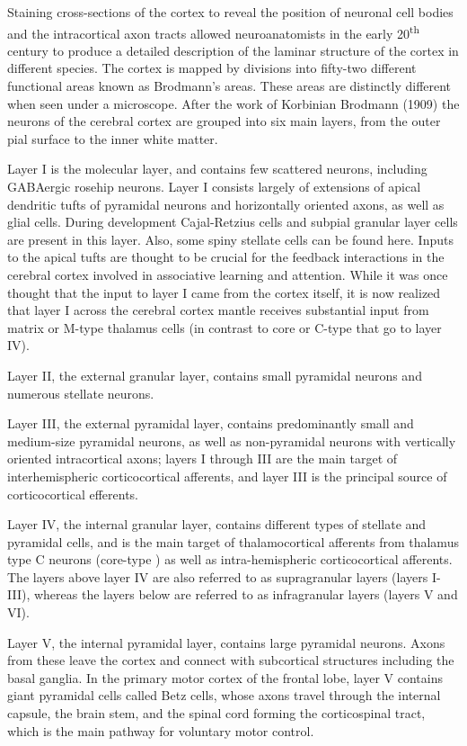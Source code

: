 Staining cross-sections of the cortex to reveal the position of neuronal cell bodies and the intracortical axon tracts allowed neuroanatomists in the early 20\textsuperscript{th} century to produce a detailed description of the laminar structure of the cortex in different species. The cortex is mapped by divisions into fifty-two different functional areas known as Brodmann's areas. These areas are distinctly different when seen under a microscope. After the work of Korbinian Brodmann (1909) the neurons of the cerebral cortex are grouped into six main layers, from the outer pial surface to the inner white matter.

Layer I is the molecular layer, and contains few scattered neurons, including GABAergic rosehip neurons. Layer I consists largely of extensions of apical dendritic tufts of pyramidal neurons and horizontally oriented axons, as well as glial cells. During development Cajal-Retzius cells and subpial granular layer cells are present in this layer. Also, some spiny stellate cells can be found here. Inputs to the apical tufts are thought to be crucial for the feedback interactions in the cerebral cortex involved in associative learning and attention. While it was once thought that the input to layer I came from the cortex itself, it is now realized that layer I across the cerebral cortex mantle receives substantial input from matrix or M-type thalamus cells (in contrast to core or C-type that go to layer IV).

Layer II, the external granular layer, contains small pyramidal neurons and numerous stellate neurons.

Layer III, the external pyramidal layer, contains predominantly small and medium-size pyramidal neurons, as well as non-pyramidal neurons with vertically oriented intracortical axons; layers I through III are the main target of interhemispheric corticocortical afferents, and layer III is the principal source of corticocortical efferents.

Layer IV, the internal granular layer, contains different types of stellate and pyramidal cells, and is the main target of thalamocortical afferents from thalamus type C neurons (core-type ) as well as intra-hemispheric corticocortical afferents. The layers above layer IV are also referred to as supragranular layers (layers I-III), whereas the layers below are referred to as infragranular layers (layers V and VI).

Layer V, the internal pyramidal layer, contains large pyramidal neurons. Axons from these leave the cortex and connect with subcortical structures including the basal ganglia. In the primary motor cortex of the frontal lobe, layer V contains giant pyramidal cells called Betz cells, whose axons travel through the internal capsule, the brain stem, and the spinal cord forming the corticospinal tract, which is the main pathway for voluntary motor control.

